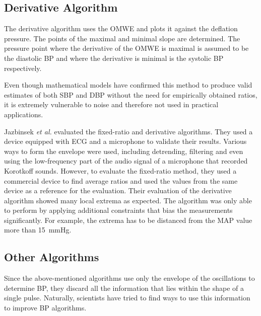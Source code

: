 

\subsection{Derivative Algorithm}
The derivative algorithm uses the OMWE and plots it against the deflation pressure. The points of the maximal and minimal slope are determined. The pressure point where the derivative of the OMWE is maximal is assumed to be the diastolic BP and where the derivative is minimal is the systolic BP respectively. \cite{Jazbinsek2010,Forouzanfar2015}

Even though mathematical models have confirmed this method to produce valid estimates of both SBP and DBP without the need for empirically obtained ratios, it is extremely vulnerable to noise and therefore not used in practical applications.  \cite{Babbs2012,Chandrasekhar2019}

Jazbinsek \textit{et al.} evaluated the fixed-ratio and derivative algorithms. They used a device equipped with ECG and a microphone to validate their results. Various ways to form the envelope were used, including detrending, filtering and even using the low-frequency part of the audio signal of a microphone that recorded Korotkoff sounds. However, to evaluate the fixed-ratio method, they used a commercial device to find average ratios and used the values from the same device as a reference for the evaluation. Their evaluation of the derivative algorithm showed many local extrema as expected. The algorithm was only able to perform by applying additional constraints that bias the measurements significantly. For example, the extrema has to be distanced from the MAP value more than \SI{15}{\mmHg}. \cite{Jazbinsek2010,Jazbinsek2005,Jazbinsek2016}


\subsection{Other Algorithms}
Since the above-mentioned algorithms use only the envelope of the oscillations to determine BP, they discard all the information that lies within the shape of a single pulse. Naturally, scientists have tried to find ways to use this information to improve BP algorithms.

